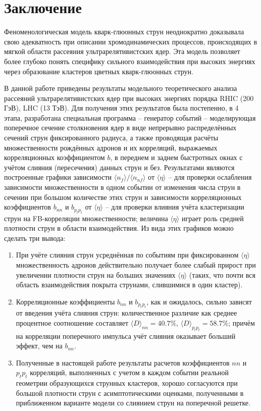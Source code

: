 \section{Заключение}
Феноменологическая модель кварк-глюонных струн неоднократно доказывала свою адекватность при описании хромодинамических процессов, происходящих в мягкой области рассеяния ультрарелятивистских ядер. Эта модель позволяет более глубоко понять специфику сильного взаимодействия при высоких энергиях через образование кластеров цветных кварк-глюонных струн. 

В данной работе приведены результаты модельного теоретического анализа рассеяний ультрарелятивистских ядер при высоких энергиях порядка RHIC (200 ГэВ), LHC (13 ТэВ). Для получения этих результатов была постепенно, в 4 этапа, разработана специальная программа -- генератор событий -- моделирующая поперечное сечение столкновения ядер в виде непрерывно распределённых сечений струн фиксированного радиуса, а также проводящая расчёты множественности рождённых адронов и их корреляций, выражаемых корреляционных коэффициентом $b$, в переднем и заднем быстротных окнах с учётом слияния (пересечения) данных струн и без. Результатами являются построенные графики зависимости $\langle n_{f} \rangle / \langle n_{nf} \rangle$ от $\langle \eta \rangle$ -- для проверки ослабления зависимости множественности в одном событии от изменения числа струн в сечении при большом количестве этих струн и зависимости корреляционных коэффициентов $b_{nn}$ и $b_{p_tp_t}$ от $\langle \eta \rangle$ -- для проверки влияния учёта кластеризации струн на FB-корреляции множественности; величина $\langle \eta \rangle$ играет роль средней плотности струн в области взаимодействия. Из вида этих графиков можно сделать три вывода: 
\begin{enumerate}[label=\arabic*.]
\item	При учёте слияния струн усреднённая по событиям при фиксированном $\langle \eta \rangle$ множественность адронов действительно получает более слабый прирост при увеличении плотности струн на больших значениях $\langle \eta \rangle$ (таких, что почти вся область взаимодействия покрыта струнами, слившимися в один кластер).
\item	Корреляционные коэффициенты $b_{nn}$ и $b_{p_tp_t}$, как и ожидалось, сильно зависят от введения учёта слияния струн: количественное различие как среднее процентное соотношение составляет $\langle D \rangle _{nn} = 40.7 \%$, $\langle D \rangle _{p_tp_t} = 58.7 \%$; причём на корреляции поперечного импульса учёт слияния оказывает больший эффект, чем на $b_{nn}$.
\item   Полученные в настоящей работе результаты расчетов коэффициентов $nn$ и $p_tp_t$ корреляций, выполненных с учетом в каждом событии реальной геометрии образующихся струнных кластеров, хорошо согласуются при большой плотности струн с асимптотическими оценками, полученными в приближенном варианте модели со слиянием струн на поперечной решетке.
\end{enumerate}
